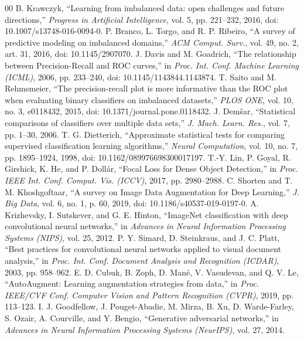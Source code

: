 \documentclass[conference]{IEEEtran}
\begin{document}
\begin{thebibliography}{00}
 B. Krawczyk, ``Learning from imbalanced data: open challenges and future directions,'' \emph{Progress in Artificial Intelligence}, vol. 5, pp. 221--232, 2016, doi: 10.1007/s13748-016-0094-0.
 P. Branco, L. Torgo, and R. P. Ribeiro, ``A survey of predictive modeling on imbalanced domains,'' \emph{ACM Comput. Surv.}, vol. 49, no. 2, art. 31, 2016, doi: 10.1145/2907070.
 J. Davis and M. Goadrich, ``The relationship between Precision-Recall and ROC curves,'' in \emph{Proc. Int. Conf. Machine Learning (ICML)}, 2006, pp. 233--240, doi: 10.1145/1143844.1143874.
 T. Saito and M. Rehmsmeier, ``The precision-recall plot is more informative than the ROC plot when evaluating binary classifiers on imbalanced datasets,'' \emph{PLOS ONE}, vol. 10, no. 3, e0118432, 2015, doi: 10.1371/journal.pone.0118432.
 J. Dem\v{s}ar, ``Statistical comparisons of classifiers over multiple data sets,'' \emph{J. Mach. Learn. Res.}, vol. 7, pp. 1--30, 2006.
 T. G. Dietterich, ``Approximate statistical tests for comparing supervised classification learning algorithms,'' \emph{Neural Computation}, vol. 10, no. 7, pp. 1895--1924, 1998, doi: 10.1162/089976698300017197.
 T.-Y. Lin, P. Goyal, R. Girshick, K. He, and P. Dollár, ``Focal Loss for Dense Object Detection,'' in \emph{Proc. IEEE Int. Conf. Comput. Vis. (ICCV)}, 2017, pp. 2980--2988.
 C. Shorten and T. M. Khoshgoftaar, ``A survey on Image Data Augmentation for Deep Learning,'' \emph{J. Big Data}, vol. 6, no. 1, p. 60, 2019, doi: 10.1186/s40537-019-0197-0.
 A. Krizhevsky, I. Sutskever, and G. E. Hinton, ``ImageNet classification with deep convolutional neural networks,'' in \emph{Advances in Neural Information Processing Systems (NIPS)}, vol. 25, 2012.
 P. Y. Simard, D. Steinkraus, and J. C. Platt, ``Best practices for convolutional neural networks applied to visual document analysis,'' in \emph{Proc. Int. Conf. Document Analysis and Recognition (ICDAR)}, 2003, pp. 958--962.
 E. D. Cubuk, B. Zoph, D. Man\'{e}, V. Vasudevan, and Q. V. Le, ``AutoAugment: Learning augmentation strategies from data,'' in \emph{Proc. IEEE/CVF Conf. Computer Vision and Pattern Recognition (CVPR)}, 2019, pp. 113--123.
 I. J. Goodfellow, J. Pouget-Abadie, M. Mirza, B. Xu, D. Warde-Farley, S. Ozair, A. Courville, and Y. Bengio, ``Generative adversarial networks,'' in \emph{Advances in Neural Information Processing Systems (NeurIPS)}, vol. 27, 2014.

\end{thebibliography}
\end{document}
